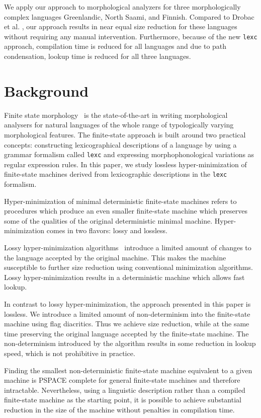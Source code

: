 \documentclass[11pt]{article}
\begin{document}
We apply our approach to morphological analyzers for three
morphologically complex languages Greenlandic, North Saami, and
Finnish. Compared to Drobac et al. , our approach
results in near equal size reduction for these languages without
requiring any manual intervention. Furthermore, because of the new
\texttt{lexc} approach, compilation time is reduced for all languages
and due to path condensation, lookup time is reduced for all three
languages.

\section{Background}
Finite state morphology~\cite{beesley2003finite} is the
state-of-the-art in writing morphological analysers for natural
languages of the whole range of typologically varying morphological
features. The finite-state approach is built around two practical
concepts: constructing lexicographical descriptions of a language
by using a grammar formalism called \texttt{lexc} and expressing morphophonological
variations as regular expression rules. In this paper, we study lossless
hyper-minimization of finite-state machines derived from lexicographic
descriptions in the \texttt{lexc} formalism.

Hyper-minimization of minimal deterministic finite-state machines
refers to procedures which produce an even smaller finite-state
machine which preserves some of the qualities of the original
deterministic minimal machine. Hyper-minimization comes in two flavors:
lossy and lossless.

Lossy hyper-minimization algorithms~\cite{maletti2011} introduce a
limited amount of changes to the language accepted by the original
machine. This makes the machine susceptible to further size reduction
using conventional minimization algorithms. Lossy hyper-minimization
results in a deterministic machine which allows fast lookup.

In contrast to lossy hyper-minimization, the approach presented in
this paper is lossless. We introduce a limited amount of
non-determinism into the finite-state machine using flag
diacritics. Thus we achieve size reduction, while at the same time
preserving the original language accepted by the finite-state
machine. The non-determinism introduced by the algorithm results in
some reduction in lookup speed, which is not prohibitive in practice.

Finding the smallest non-deterministic finite-state machine equivalent
to a given machine is PSPACE complete \cite{jiang1993} for general
finite-state machines and therefore intractable. Nevertheless, using a
linguistic description rather than a compiled finite-state machine
as the starting point, it is possible to achieve substantial reduction in
the size of the machine without penalties in compilation time.
\end{document}
